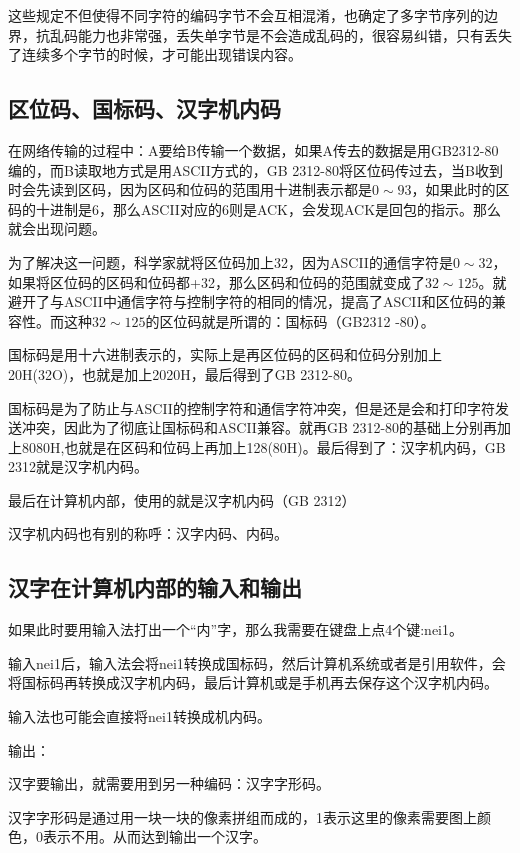这些规定不但使得不同字符的编码字节不会互相混淆，也确定了多字节序列的边界，抗乱码能力也非常强，丢失单字节是不会造成乱码的，很容易纠错，只有丢失了连续多个字节的时候，才可能出现错误内容。

\subsection{区位码、国标码、汉字机内码}

在网络传输的过程中：A要给B传输一个数据，如果A传去的数据是用GB2312-80编的，而B读取地方式是用ASCII方式的，GB 2312-80将区位码传过去，当B收到时会先读到区码，因为区码和位码的范围用十进制表示都是$0\sim 93$，如果此时的区码的十进制是6，那么ASCII对应的6则是ACK，会发现ACK是回包的指示。那么就会出现问题。

为了解决这一问题，科学家就将区位码加上32，因为ASCII的通信字符是$0\sim 32$，如果将区位码的区码和位码都+32，那么区码和位码的范围就变成了$32\sim 125$。就避开了与ASCII中通信字符与控制字符的相同的情况，提高了ASCII和区位码的兼容性。而这种$32\sim 125$的区位码就是所谓的：国标码（GB2312 -80）。

国标码是用十六进制表示的，实际上是再区位码的区码和位码分别加上20H(32O)，也就是加上2020H，最后得到了GB 2312-80。

国标码是为了防止与ASCII的控制字符和通信字符冲突，但是还是会和打印字符发送冲突，因此为了彻底让国标码和ASCII兼容。就再GB 2312-80的基础上分别再加上8080H,也就是在区码和位码上再加上128(80H)。最后得到了：汉字机内码，GB 2312就是汉字机内码。

最后在计算机内部，使用的就是汉字机内码（GB 2312）

汉字机内码也有别的称呼：汉字内码、内码。

\subsection{汉字在计算机内部的输入和输出}

如果此时要用输入法打出一个“内”字，那么我需要在键盘上点4个键:nei1。

输入nei1后，输入法会将nei1转换成国标码，然后计算机系统或者是引用软件，会将国标码再转换成汉字机内码，最后计算机或是手机再去保存这个汉字机内码。       

输入法也可能会直接将nei1转换成机内码。

输出：

汉字要输出，就需要用到另一种编码：汉字字形码。

汉字字形码是通过用一块一块的像素拼组而成的，1表示这里的像素需要图上颜色，0表示不用。从而达到输出一个汉字。 

